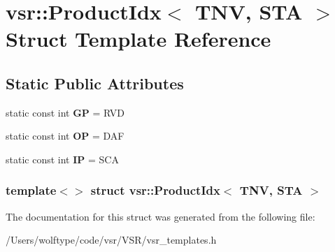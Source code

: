 \hypertarget{structvsr_1_1_product_idx_3_01_t_n_v_00_01_s_t_a_01_4}{\section{vsr\-:\-:Product\-Idx$<$ T\-N\-V, S\-T\-A $>$ Struct Template Reference}
\label{structvsr_1_1_product_idx_3_01_t_n_v_00_01_s_t_a_01_4}
}
\subsection*{Static Public Attributes}
\begin{DoxyCompactItemize}
\item 
\hypertarget{structvsr_1_1_product_idx_3_01_t_n_v_00_01_s_t_a_01_4_ae06a58c9fe83cc58c15e2ed5268bc7ed}{static const int {\bfseries G\-P} = R\-V\-D}\label{structvsr_1_1_product_idx_3_01_t_n_v_00_01_s_t_a_01_4_ae06a58c9fe83cc58c15e2ed5268bc7ed}

\item 
\hypertarget{structvsr_1_1_product_idx_3_01_t_n_v_00_01_s_t_a_01_4_a77739f6e706b5fe8038758b34dc15fc8}{static const int {\bfseries O\-P} = D\-A\-F}\label{structvsr_1_1_product_idx_3_01_t_n_v_00_01_s_t_a_01_4_a77739f6e706b5fe8038758b34dc15fc8}

\item 
\hypertarget{structvsr_1_1_product_idx_3_01_t_n_v_00_01_s_t_a_01_4_a752e1f49d36f5137ec8dd7139c202542}{static const int {\bfseries I\-P} = S\-C\-A}\label{structvsr_1_1_product_idx_3_01_t_n_v_00_01_s_t_a_01_4_a752e1f49d36f5137ec8dd7139c202542}

\end{DoxyCompactItemize}
\subsubsection*{template$<$$>$ struct vsr\-::\-Product\-Idx$<$ T\-N\-V, S\-T\-A $>$}



The documentation for this struct was generated from the following file\-:\begin{DoxyCompactItemize}
\item 
/\-Users/wolftype/code/vsr/\-V\-S\-R/vsr\-\_\-templates.\-h\end{DoxyCompactItemize}
